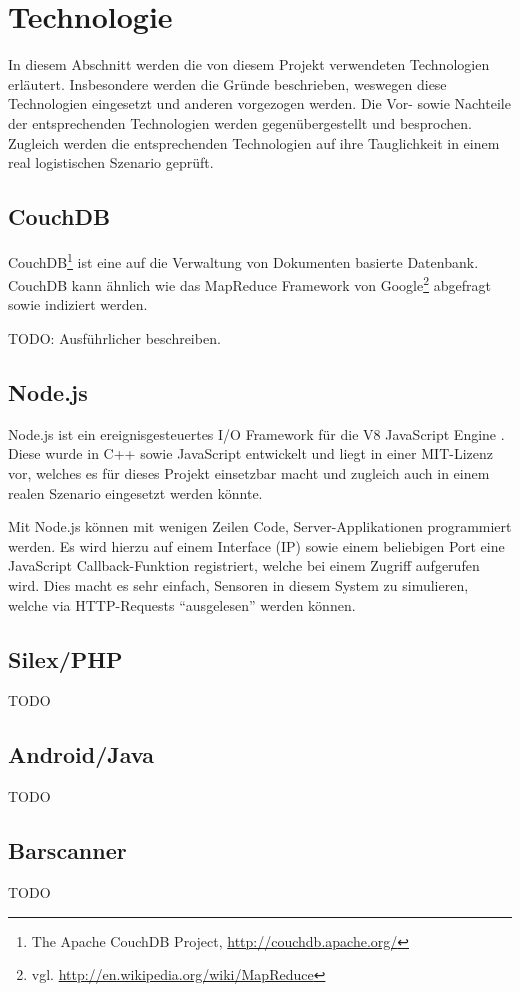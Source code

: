 \section{Technologie}
\label{sec:technology}

In diesem Abschnitt werden die von diesem Projekt verwendeten Technologien erläutert. Insbesondere werden die Gründe beschrieben, weswegen diese Technologien eingesetzt und anderen vorgezogen werden. Die Vor- sowie Nachteile der entsprechenden Technologien werden gegenübergestellt und besprochen. Zugleich werden die entsprechenden Technologien auf ihre Tauglichkeit in einem real logistischen Szenario geprüft.

\subsection{CouchDB}
\label{subsec:couchdb}
CouchDB\footnote{The Apache CouchDB Project, \url{http://couchdb.apache.org/}} ist eine auf die Verwaltung von Dokumenten basierte Datenbank. CouchDB kann ähnlich wie das MapReduce Framework von Google\footnote{vgl. \url{http://en.wikipedia.org/wiki/MapReduce}} abgefragt sowie indiziert werden.

TODO: Ausführlicher beschreiben.

\subsection{Node.js}
\label{subsec:nodejs}

Node.js ist ein ereignisgesteuertes I/O Framework für die V8 JavaScript Engine \cite{Wikipedia10a}. Diese wurde in C++ sowie JavaScript entwickelt und liegt in einer MIT-Lizenz vor, welches es für dieses Projekt einsetzbar macht und zugleich auch in einem realen Szenario eingesetzt werden könnte.

Mit Node.js können mit wenigen Zeilen Code, Server-Applikationen programmiert werden. Es wird hierzu auf einem Interface (IP) sowie einem beliebigen Port eine JavaScript Callback-Funktion registriert, welche bei einem Zugriff aufgerufen wird. Dies macht es sehr einfach, Sensoren in diesem System zu simulieren, welche via HTTP-Requests ``ausgelesen'' werden können.


\subsection{Silex/PHP}

TODO

\subsection{Android/Java}

TODO

\subsection{Barscanner}

TODO